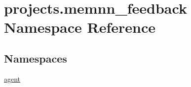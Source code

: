 \hypertarget{namespaceprojects_1_1memnn__feedback}{}\section{projects.\+memnn\+\_\+feedback Namespace Reference}
\label{namespaceprojects_1_1memnn__feedback}
\subsection*{Namespaces}
\begin{DoxyCompactItemize}
\item 
 \hyperlink{namespaceprojects_1_1memnn__feedback_1_1agent}{agent}
\end{DoxyCompactItemize}
